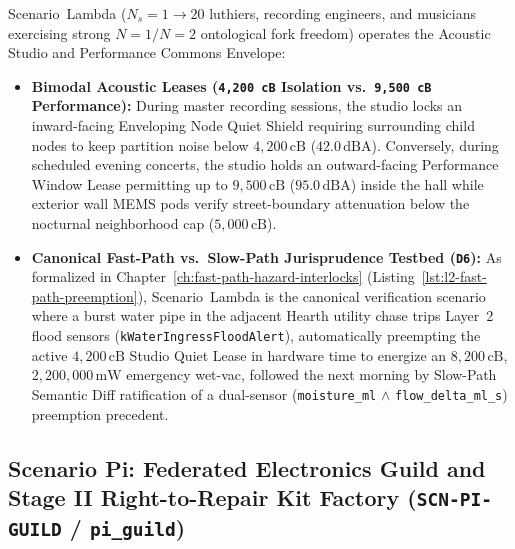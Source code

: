 Scenario~Lambda ($N_s = 1 \to 20$ luthiers, recording engineers, and musicians exercising strong $N=1 / N=2$ ontological fork freedom) operates the Acoustic Studio and Performance Commons Envelope:
\begin{itemize}
    \item \textbf{Bimodal Acoustic Leases (\texttt{4,200 cB} Isolation vs.\ \texttt{9,500 cB} Performance):} During master recording sessions, the studio locks an inward-facing Enveloping Node Quiet Shield requiring surrounding child nodes to keep partition noise below $4{,}200\,\mathrm{cB}$ ($42.0\,\mathrm{dBA}$). Conversely, during scheduled evening concerts, the studio holds an outward-facing Performance Window Lease permitting up to $9{,}500\,\mathrm{cB}$ ($95.0\,\mathrm{dBA}$) inside the hall while exterior wall MEMS pods verify street-boundary attenuation below the nocturnal neighborhood cap ($5{,}000\,\mathrm{cB}$).
    \item \textbf{Canonical Fast-Path vs.\ Slow-Path Jurisprudence Testbed (\texttt{D6}):} As formalized in Chapter~\ref{ch:fast-path-hazard-interlocks} (Listing~\ref{lst:l2-fast-path-preemption}), Scenario~Lambda is the canonical verification scenario where a burst water pipe in the adjacent Hearth utility chase trips Layer~2 flood sensors (\texttt{kWaterIngressFloodAlert}), automatically preempting the active $4{,}200\,\mathrm{cB}$ Studio Quiet Lease in hardware time to energize an $8{,}200\,\mathrm{cB}$, $2{,}200{,}000\,\mathrm{mW}$ emergency wet-vac, followed the next morning by Slow-Path Semantic Diff ratification of a dual-sensor (\texttt{moisture\_ml} $\land$ \texttt{flow\_delta\_ml\_s}) preemption precedent.
\end{itemize}

\subsection{Scenario Pi: Federated Electronics Guild and Stage II Right-to-Repair Kit Factory (\texttt{SCN-PI-GUILD} / \texttt{pi\_guild})}

